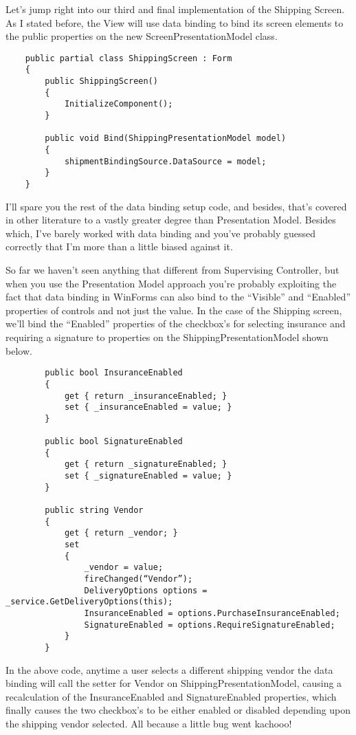 \documentclass{article}
\begin{document}
{Let's jump right into our third and final implementation of the Shipping Screen.  As I stated before, the View will use data binding to bind its screen elements to the public properties on the new ScreenPresentationModel class.

\begin{lstlisting}
    public partial class ShippingScreen : Form
    {
        public ShippingScreen()
        {
            InitializeComponent();
        } 

        public void Bind(ShippingPresentationModel model)
        {
            shipmentBindingSource.DataSource = model;
        }
    }
\end{lstlisting}	

I'll spare you the rest of the data binding setup code, and besides, that's covered in other literature to a vastly greater degree than Presentation Model.  Besides which, I've barely worked with data binding and you've probably guessed correctly that I'm more than a little biased against it.

So far we haven't seen anything that different from Supervising Controller, but when you use the Presentation Model approach you're probably exploiting the fact that data binding in WinForms can also bind to the “Visible” and “Enabled” properties of controls and not just the value.  In the case of the Shipping screen, we'll bind the “Enabled” properties of the checkbox's for selecting insurance and requiring a signature to properties on the ShippingPresentationModel shown below.
\begin{lstlisting}
        public bool InsuranceEnabled
        {
            get { return _insuranceEnabled; }
            set { _insuranceEnabled = value; }
        } 

        public bool SignatureEnabled
        {
            get { return _signatureEnabled; }
            set { _signatureEnabled = value; }
        }

        public string Vendor
        {
            get { return _vendor; }
            set
            {
                _vendor = value;
                fireChanged(“Vendor”);
                DeliveryOptions options = _service.GetDeliveryOptions(this);
                InsuranceEnabled = options.PurchaseInsuranceEnabled;
                SignatureEnabled = options.RequireSignatureEnabled;
            }
        }
\end{lstlisting}

In the above code, anytime a user selects a different shipping vendor the data binding will call the setter for Vendor on ShippingPresentationModel, causing a recalculation of the InsuranceEnabled and SignatureEnabled properties, which finally causes the two checkbox's to be either enabled or disabled depending upon the shipping vendor selected.  All because a little bug went kachooo!

}
\end{document}
